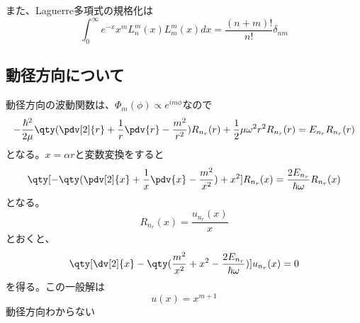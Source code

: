 \documentclass[a4paper,11pt,uplatex]{jsarticle}%
\begin{document}
また、Laguerre多項式の規格化は
\begin{equation}
  \int_{0}^{\infty}e^{-x}x^{m}L_n^m(x)L_m^m(x)dx = \frac{(n+m)!}{n!}\delta_{nm}
\end{equation}

\subsection*{動径方向について}
動径方向の波動関数は、$\Phi_m(\phi) \propto e^{im\phi}$なので
\begin{equation}
  -\frac{\hbar^2}{2\mu}\qty(\pdv[2]{r} + \frac{1}{r}\pdv{r} - \frac{m^2}{r^2})R_{n_r}(r) + \frac{1}{2}\mu\omega^2r^2R_{n_r}(r) = E_{n_r}R_{n_r}(r)
\end{equation}
となる。$x=\alpha r$と変数変換をすると
\begin{equation}
  \qty[-\qty(\pdv[2]{x} + \frac{1}{x}\pdv{x} - \frac{m^2}{x^2}) + x^2]R_{n_r}(x) = \frac{2E_{n_r}}{\hbar\omega}R_{n_r}(x)
\end{equation}
となる。
\begin{equation}
  R_{n_r}(x) = \frac{u_{n_r}(x)}{x}
\end{equation}
とおくと、
\begin{equation}
  \qty[\dv[2]{x} - \qty(\frac{m^2}{x^2} + x^2 - \frac{2E_{n_r}}{\hbar\omega})]u_{n_r}(x) = 0
\end{equation}
を得る。この一般解は
\begin{equation}
  u(x) = x^{m+1}
\end{equation}
動径方向わからない
\end{document}
